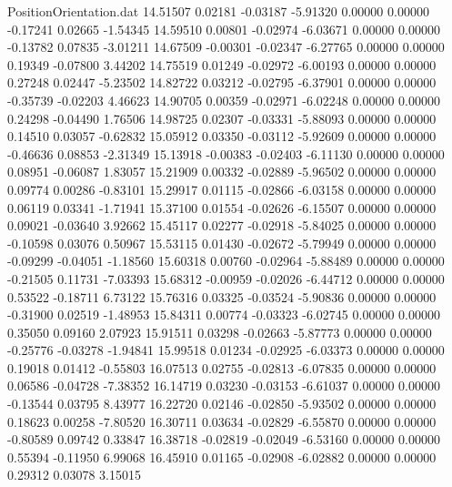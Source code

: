 \begin{filecontents}{PositionOrientation.dat}
  14.51507    0.02181   -0.03187    -5.91320    0.00000    0.00000   -0.17241    0.02665   -1.54345
  14.59510    0.00801   -0.02974    -6.03671    0.00000    0.00000   -0.13782    0.07835   -3.01211
  14.67509   -0.00301   -0.02347    -6.27765    0.00000    0.00000    0.19349   -0.07800    3.44202
  14.75519    0.01249   -0.02972    -6.00193    0.00000    0.00000    0.27248    0.02447   -5.23502
  14.82722    0.03212   -0.02795    -6.37901    0.00000    0.00000   -0.35739   -0.02203    4.46623
  14.90705    0.00359   -0.02971    -6.02248    0.00000    0.00000    0.24298   -0.04490    1.76506
  14.98725    0.02307   -0.03331    -5.88093    0.00000    0.00000    0.14510    0.03057   -0.62832
  15.05912    0.03350   -0.03112    -5.92609    0.00000    0.00000   -0.46636    0.08853   -2.31349
  15.13918   -0.00383   -0.02403    -6.11130    0.00000    0.00000    0.08951   -0.06087    1.83057
  15.21909    0.00332   -0.02889    -5.96502    0.00000    0.00000    0.09774    0.00286   -0.83101
  15.29917    0.01115   -0.02866    -6.03158    0.00000    0.00000    0.06119    0.03341   -1.71941
  15.37100    0.01554   -0.02626    -6.15507    0.00000    0.00000    0.09021   -0.03640    3.92662
  15.45117    0.02277   -0.02918    -5.84025    0.00000    0.00000   -0.10598    0.03076    0.50967
  15.53115    0.01430   -0.02672    -5.79949    0.00000    0.00000   -0.09299   -0.04051   -1.18560
  15.60318    0.00760   -0.02964    -5.88489    0.00000    0.00000   -0.21505    0.11731   -7.03393
  15.68312   -0.00959   -0.02026    -6.44712    0.00000    0.00000    0.53522   -0.18711    6.73122
  15.76316    0.03325   -0.03524    -5.90836    0.00000    0.00000   -0.31900    0.02519   -1.48953
  15.84311    0.00774   -0.03323    -6.02745    0.00000    0.00000    0.35050    0.09160    2.07923
  15.91511    0.03298   -0.02663    -5.87773    0.00000    0.00000   -0.25776   -0.03278   -1.94841
  15.99518    0.01234   -0.02925    -6.03373    0.00000    0.00000    0.19018    0.01412   -0.55803
  16.07513    0.02755   -0.02813    -6.07835    0.00000    0.00000    0.06586   -0.04728   -7.38352
  16.14719    0.03230   -0.03153    -6.61037    0.00000    0.00000   -0.13544    0.03795    8.43977
  16.22720    0.02146   -0.02850    -5.93502    0.00000    0.00000    0.18623    0.00258   -7.80520
  16.30711    0.03634   -0.02829    -6.55870    0.00000    0.00000   -0.80589    0.09742    0.33847
  16.38718   -0.02819   -0.02049    -6.53160    0.00000    0.00000    0.55394   -0.11950    6.99068
  16.45910    0.01165   -0.02908    -6.02882    0.00000    0.00000    0.29312    0.03078    3.15015

\end{filecontents}
